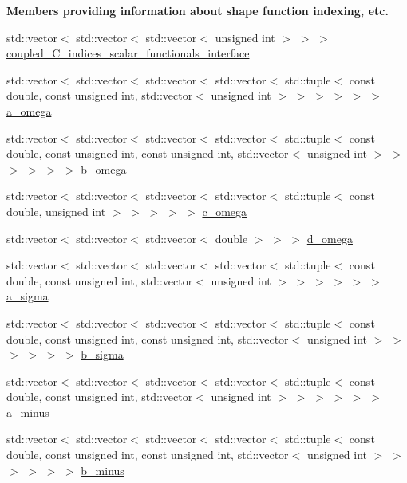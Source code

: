 \begin{Indent}{\bf Members providing information about shape function indexing, etc.}
\begin{DoxyCompactItemize}
\item 
std\+::vector$<$ std\+::vector$<$ std\+::vector$<$ unsigned int $>$ $>$ $>$ \hyperlink{class_assembly_helper_a311e176038ee2b7ca0719abb384ca57b}{coupled\+\_\+\+C\+\_\+indices\+\_\+scalar\+\_\+functionals\+\_\+interface}
\item 
std\+::vector$<$ std\+::vector$<$ std\+::vector$<$ std\+::vector$<$ std\+::tuple$<$ const double, const unsigned int, std\+::vector$<$ unsigned int $>$ $>$ $>$ $>$ $>$ $>$ \hyperlink{class_assembly_helper_a13fef9096e5fc7b1e922ea78d7aa2c28}{a\+\_\+omega}
\item 
std\+::vector$<$ std\+::vector$<$ std\+::vector$<$ std\+::vector$<$ std\+::tuple$<$ const double, const unsigned int, const unsigned int, std\+::vector$<$ unsigned int $>$ $>$ $>$ $>$ $>$ $>$ \hyperlink{class_assembly_helper_a5fbb532e798c2427af5285c2df10c9f4}{b\+\_\+omega}
\item 
std\+::vector$<$ std\+::vector$<$ std\+::vector$<$ std\+::vector$<$ std\+::tuple$<$ const double, unsigned int $>$ $>$ $>$ $>$ $>$ \hyperlink{class_assembly_helper_a75e6f76c0b12b91c5feb230251f0137f}{c\+\_\+omega}
\item 
std\+::vector$<$ std\+::vector$<$ std\+::vector$<$ double $>$ $>$ $>$ \hyperlink{class_assembly_helper_ad93b109608d4425d318434e01cb6246c}{d\+\_\+omega}
\item 
std\+::vector$<$ std\+::vector$<$ std\+::vector$<$ std\+::vector$<$ std\+::tuple$<$ const double, const unsigned int, std\+::vector$<$ unsigned int $>$ $>$ $>$ $>$ $>$ $>$ \hyperlink{class_assembly_helper_aa266cc07e9670319481da52d633d2583}{a\+\_\+sigma}
\item 
std\+::vector$<$ std\+::vector$<$ std\+::vector$<$ std\+::vector$<$ std\+::tuple$<$ const double, const unsigned int, const unsigned int, std\+::vector$<$ unsigned int $>$ $>$ $>$ $>$ $>$ $>$ \hyperlink{class_assembly_helper_af58c9a1c7093edc306070913aa1b9be2}{b\+\_\+sigma}
\item 
std\+::vector$<$ std\+::vector$<$ std\+::vector$<$ std\+::vector$<$ std\+::tuple$<$ const double, const unsigned int, std\+::vector$<$ unsigned int $>$ $>$ $>$ $>$ $>$ $>$ \hyperlink{class_assembly_helper_a4461be378c9be0364ca23153c367d24c}{a\+\_\+minus}
\item 
std\+::vector$<$ std\+::vector$<$ std\+::vector$<$ std\+::vector$<$ std\+::tuple$<$ const double, const unsigned int, const unsigned int, std\+::vector$<$ unsigned int $>$ $>$ $>$ $>$ $>$ $>$ \hyperlink{class_assembly_helper_a6f51f8b4dfdae385a2e2fe2dd9e66cdb}{b\+\_\+minus}
\item 

\end{DoxyCompactItemize}
\end{Indent}
